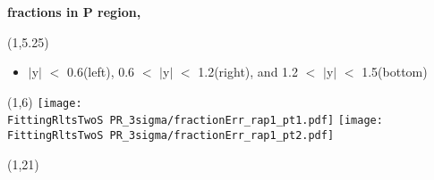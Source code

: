 \documentclass[11pt,slidescentered,red,compress,handout,hyperref={bookmarks=true},mathseriftable]{beamer}
\newcommand{\lpsi}{\ell_{\psi}}
\newcommand{\FittingRltsOneS}{../Psi1S/Fit/parameter/evaluateCtau/}
\newcommand{\FittingRltsTwoS}{../Psi2S/Fit/parameter/evaluateCtau/}
\begin{document}
\begin{frame}[t]{\small \bf fractions in P region,  }{}
\begin{textblock}{48}(1,5.25)
\begin{itemize}
\scriptsize \item $|$y$|$ $<$ 0.6(left), 0.6 $<$ $|$y$|$ $<$ 1.2(right), and 1.2 $<$ $|$y$|$ $<$ 1.5(bottom)
\end{itemize}
\end{textblock}
\begin{textblock}{48}(1,6)
\hspace*{10pt} \texttt{[image: \\FittingRltsTwoS PR\_3sigma/fractionErr\_rap1\_pt1.pdf]}
\hspace*{10pt} \texttt{[image: \\FittingRltsTwoS PR\_3sigma/fractionErr\_rap1\_pt2.pdf]}
\begin{textblock}{48}(1,21)
\end{textblock}
\end{textblock}
\end{frame}


\end{document}
